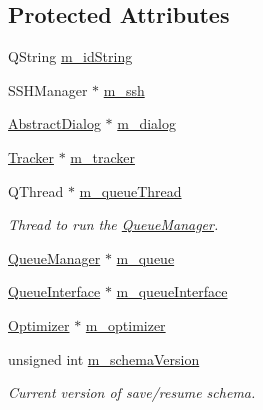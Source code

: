 \subsection*{Protected Attributes}
\begin{DoxyCompactItemize}
\item 
Q\-String \hyperlink{classGlobalSearch_1_1OptBase_af9223062bbb616246d5bf60ad29e1c7d}{m\-\_\-id\-String}
\item 
S\-S\-H\-Manager $\ast$ \hyperlink{classGlobalSearch_1_1OptBase_a723a6dd0bb93aff451007ccb079e2f65}{m\-\_\-ssh}
\item 
\hyperlink{classGlobalSearch_1_1AbstractDialog}{Abstract\-Dialog} $\ast$ \hyperlink{classGlobalSearch_1_1OptBase_a4673e81b57e648320474bf3024906161}{m\-\_\-dialog}
\item 
\hyperlink{classGlobalSearch_1_1Tracker}{Tracker} $\ast$ \hyperlink{classGlobalSearch_1_1OptBase_a60a2c6053a8ae3716854c68d0837b921}{m\-\_\-tracker}
\item 
\hypertarget{classGlobalSearch_1_1OptBase_a80b28eb1b9d8d7a055ddabb55c753f20}{Q\-Thread $\ast$ \hyperlink{classGlobalSearch_1_1OptBase_a80b28eb1b9d8d7a055ddabb55c753f20}{m\-\_\-queue\-Thread}}\label{classGlobalSearch_1_1OptBase_a80b28eb1b9d8d7a055ddabb55c753f20}

\begin{DoxyCompactList}\small\item\em Thread to run the \hyperlink{classGlobalSearch_1_1QueueManager}{Queue\-Manager}. \end{DoxyCompactList}\item 
\hyperlink{classGlobalSearch_1_1QueueManager}{Queue\-Manager} $\ast$ \hyperlink{classGlobalSearch_1_1OptBase_a187a29ceafe0c4a45ecb7a925267f93a}{m\-\_\-queue}
\item 
\hyperlink{classGlobalSearch_1_1QueueInterface}{Queue\-Interface} $\ast$ \hyperlink{classGlobalSearch_1_1OptBase_a8f5f83dae1456bbff32ea9b3b6731ba0}{m\-\_\-queue\-Interface}
\item 
\hyperlink{classGlobalSearch_1_1Optimizer}{Optimizer} $\ast$ \hyperlink{classGlobalSearch_1_1OptBase_a9bc76450b0d52ab9fc9a4caaf97143b7}{m\-\_\-optimizer}
\item 
\hypertarget{classGlobalSearch_1_1OptBase_a7e2fe2db52705fd57edf9178e03345bd}{unsigned int \hyperlink{classGlobalSearch_1_1OptBase_a7e2fe2db52705fd57edf9178e03345bd}{m\-\_\-schema\-Version}}\label{classGlobalSearch_1_1OptBase_a7e2fe2db52705fd57edf9178e03345bd}

\begin{DoxyCompactList}\small\item\em Current version of save/resume schema. \end{DoxyCompactList}\end{DoxyCompactItemize}


